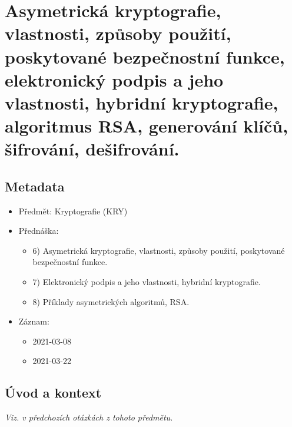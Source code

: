 

\chapter{Asymetrická kryptografie, vlastnosti, způsoby použití, poskytované bezpečnostní funkce, elektronický podpis a jeho vlastnosti, hybridní kryptografie, algoritmus RSA, generování klíčů, šifrování, dešifrování.}


\section{Metadata}

\begin{itemize}
    \item Předmět: Kryptografie (KRY)
    \item Přednáška:
    \begin{itemize}
        \item 6) Asymetrická kryptografie, vlastnosti, způsoby použití, poskytované bezpečnostní funkce.
        \item 7) Elektronický podpis a jeho vlastnosti, hybridní kryptografie.
        \item 8) Příklady asymetrických algoritmů, RSA.
    \end{itemize}
    \item Záznam:
    \begin{itemize}
        \item 2021-03-08
        \item 2021-03-22
    \end{itemize}
\end{itemize}


\section{Úvod a kontext}

\textit{Viz.  v předchozích otázkách z tohoto předmětu.}

